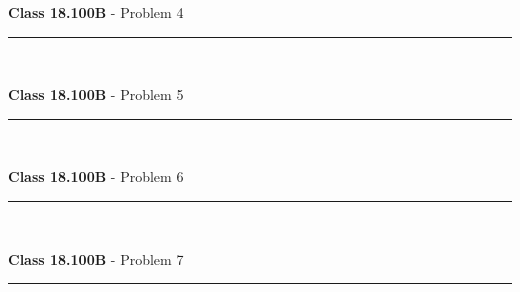 \documentclass[11pt,reqno]{article}
\begin{document}
 
\vspace{15pt}
\begin{flushleft} 
\textbf{Class 18.100B} - Problem 4\\
\rule{500pt}{1pt}\\
\end{flushleft} 


\vspace{15pt}
\begin{flushleft} 
\textbf{Class 18.100B} - Problem 5\\
\rule{500pt}{1pt}\\
\end{flushleft} 


\vspace{15pt}
\begin{flushleft} 
\textbf{Class 18.100B} - Problem 6\\
\rule{500pt}{1pt}\\
\end{flushleft} 


\vspace{15pt}
\begin{flushleft} 
\textbf{Class 18.100B} - Problem 7\\
\rule{500pt}{1pt}\\
\end{flushleft} 
\end{document}

